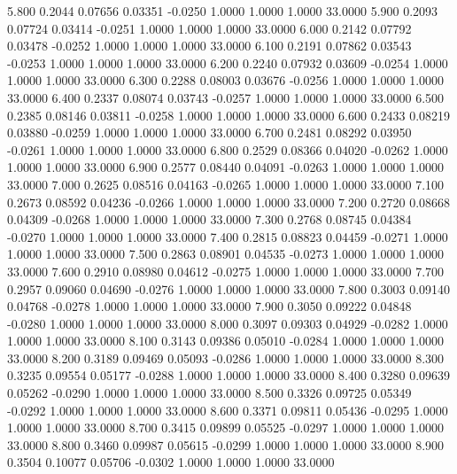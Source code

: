    5.800   0.2044   0.07656   0.03351  -0.0250   1.0000   1.0000   1.0000  33.0000
   5.900   0.2093   0.07724   0.03414  -0.0251   1.0000   1.0000   1.0000  33.0000
   6.000   0.2142   0.07792   0.03478  -0.0252   1.0000   1.0000   1.0000  33.0000
   6.100   0.2191   0.07862   0.03543  -0.0253   1.0000   1.0000   1.0000  33.0000
   6.200   0.2240   0.07932   0.03609  -0.0254   1.0000   1.0000   1.0000  33.0000
   6.300   0.2288   0.08003   0.03676  -0.0256   1.0000   1.0000   1.0000  33.0000
   6.400   0.2337   0.08074   0.03743  -0.0257   1.0000   1.0000   1.0000  33.0000
   6.500   0.2385   0.08146   0.03811  -0.0258   1.0000   1.0000   1.0000  33.0000
   6.600   0.2433   0.08219   0.03880  -0.0259   1.0000   1.0000   1.0000  33.0000
   6.700   0.2481   0.08292   0.03950  -0.0261   1.0000   1.0000   1.0000  33.0000
   6.800   0.2529   0.08366   0.04020  -0.0262   1.0000   1.0000   1.0000  33.0000
   6.900   0.2577   0.08440   0.04091  -0.0263   1.0000   1.0000   1.0000  33.0000
   7.000   0.2625   0.08516   0.04163  -0.0265   1.0000   1.0000   1.0000  33.0000
   7.100   0.2673   0.08592   0.04236  -0.0266   1.0000   1.0000   1.0000  33.0000
   7.200   0.2720   0.08668   0.04309  -0.0268   1.0000   1.0000   1.0000  33.0000
   7.300   0.2768   0.08745   0.04384  -0.0270   1.0000   1.0000   1.0000  33.0000
   7.400   0.2815   0.08823   0.04459  -0.0271   1.0000   1.0000   1.0000  33.0000
   7.500   0.2863   0.08901   0.04535  -0.0273   1.0000   1.0000   1.0000  33.0000
   7.600   0.2910   0.08980   0.04612  -0.0275   1.0000   1.0000   1.0000  33.0000
   7.700   0.2957   0.09060   0.04690  -0.0276   1.0000   1.0000   1.0000  33.0000
   7.800   0.3003   0.09140   0.04768  -0.0278   1.0000   1.0000   1.0000  33.0000
   7.900   0.3050   0.09222   0.04848  -0.0280   1.0000   1.0000   1.0000  33.0000
   8.000   0.3097   0.09303   0.04929  -0.0282   1.0000   1.0000   1.0000  33.0000
   8.100   0.3143   0.09386   0.05010  -0.0284   1.0000   1.0000   1.0000  33.0000
   8.200   0.3189   0.09469   0.05093  -0.0286   1.0000   1.0000   1.0000  33.0000
   8.300   0.3235   0.09554   0.05177  -0.0288   1.0000   1.0000   1.0000  33.0000
   8.400   0.3280   0.09639   0.05262  -0.0290   1.0000   1.0000   1.0000  33.0000
   8.500   0.3326   0.09725   0.05349  -0.0292   1.0000   1.0000   1.0000  33.0000
   8.600   0.3371   0.09811   0.05436  -0.0295   1.0000   1.0000   1.0000  33.0000
   8.700   0.3415   0.09899   0.05525  -0.0297   1.0000   1.0000   1.0000  33.0000
   8.800   0.3460   0.09987   0.05615  -0.0299   1.0000   1.0000   1.0000  33.0000
   8.900   0.3504   0.10077   0.05706  -0.0302   1.0000   1.0000   1.0000  33.0000

